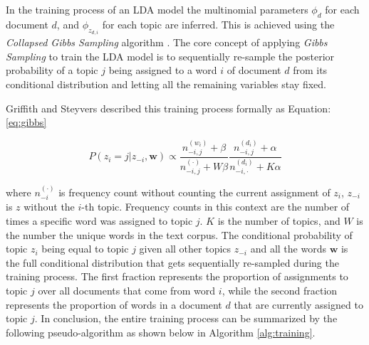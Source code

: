             In the training process of an LDA model the multinomial parameters $\phi_d$ for each document $d$, and $\phi_{z_{d,i}}$ for each topic are inferred. This is achieved using the \emph{Collapsed Gibbs Sampling} algorithm \cite{griffiths2004finding}. The core concept of applying \emph{Gibbs Sampling} to train the LDA model is to sequentially re-sample the posterior probability of a topic $j$ being assigned to a word $i$ of document $d$ from its conditional distribution and letting all the remaining variables stay fixed.
            
            Griffith and Steyvers \cite{griffiths2004finding} described this training process formally as Equation: \ref{eq:gibbs}
            
            \begin{equation} \label{eq:gibbs}
                P(z_i = j| \textbf{$z_{-i}$}, \textbf{w}) \propto \frac{n_{-i,j}^{(w_i)} + \beta}{n_{-i,j}^{(\cdot)} + W \beta} \frac{n_{-i,j}^{(d_i)} + \alpha}{n_{-i,\cdot}^{(d_i)} + K \alpha}
            \end{equation}
            
            where $n_{-i}^{(\cdot)}$ is frequency count without counting the current assignment of $z_i$, $z_{-i}$ is $z$ without the $i$-th topic. Frequency counts in this context are the number of times a specific word was assigned to topic $j$. $K$ is the number of topics, and $W$ is the number the unique words in the text corpus. The conditional probability of topic $z_i$ being equal to topic $j$ given all other topics $z_{-i}$ and all the words $\textbf{w}$ is the full conditional distribution that gets sequentially re-sampled during the training process. The first fraction represents the proportion of assignments to topic $j$ over all documents that come from word $i$, while the second fraction represents the proportion of words in a document $d$ that are currently assigned to topic $j$. In conclusion, the entire training process can be summarized by the following pseudo-algorithm as shown below in Algorithm \ref{alg:training}.
            
            
            
                    

